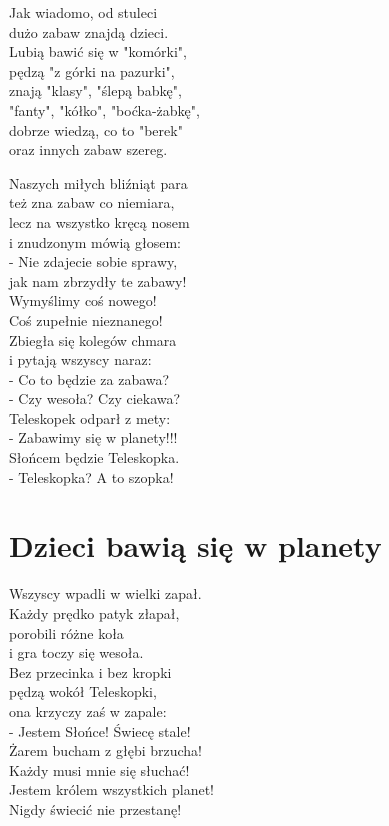 \documentclass[11pt,a4pape,leqno,twoside]{book}
\begin{document}
Jak wiadomo, od stuleci\\
dużo zabaw znajdą dzieci.\\
Lubią bawić się w "komórki",\\
pędzą "z górki na pazurki",\\
znają "klasy", "ślepą babkę",\\
"fanty", "kółko", "boćka-żabkę",\\dobrze wiedzą, co to "berek"\\
oraz innych zabaw szereg.\\ \vspace{0.1cm}

Naszych miłych bliźniąt para\\
też zna zabaw co niemiara,\\
lecz na wszystko kręcą nosem\\
i znudzonym mówią głosem:\\
- Nie zdajecie sobie sprawy,\\
jak nam zbrzydły te zabawy!\\
Wymyślimy coś nowego!\\
Coś zupełnie nieznanego!\\
Zbiegła się kolegów chmara\\
i pytają wszyscy naraz:\\
- Co to będzie za zabawa?\\
- Czy wesoła? Czy ciekawa?\\
Teleskopek odparł z mety:\\
- Zabawimy się w planety!!!\\
Słońcem będzie Teleskopka.\\
- Teleskopka? A to szopka!

\chapter{Dzieci bawią się w planety}
Wszyscy wpadli w wielki zapał.\\
Każdy prędko patyk złapał,\\
porobili różne koła\\
i gra toczy się wesoła.\\
Bez przecinka i bez kropki\\
pędzą wokół Teleskopki,\\
ona krzyczy zaś w zapale:\\
- Jestem Słońce! Świecę stale!\\
Żarem bucham z głębi brzucha!\\
Każdy musi mnie się słuchać!\\
Jestem królem wszystkich planet!\\
Nigdy świecić nie przestanę!\\ \vspace{0.1cm}
\end{document}

